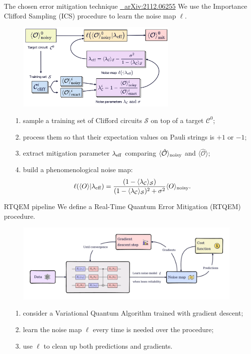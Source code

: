 \documentclass[8pt, xcolor={svgnames}, hyperref={linkcolor=black}]{beamer}
\begin{document}
\begin{frame}{The chosen error mitigation technique \hfill \href{https://arxiv.org/abs/2112.06255}{\faBook\,\, arXiv:2112.06255}}
\pause
We use the Importance Clifford Sampling (ICS) procedure to learn the noise map $\ell$.
\pause
\begin{figure}
    \includegraphics[width=0.7\textwidth]{figures/ics.png}
\end{figure}
\pause
\begin{itemize}[noitemsep]
\item[1.] sample a training set of Clifford circuits $\mathcal{S}$ on top of a target $\mathcal{C}^0$;
\pause
\item[2.] process them so that their expectation values on Pauli strings is  $+1$ or $-1$;
\pause
\item[3.] extract mitigation parameter $\lambda_{\rm eff}$ comparing $\langle \hat{\mathcal{O}}\rangle_{\rm noisy}$ and $\langle \hat{\mathcal{O}}\rangle$;
\pause
\item[4.] build a phenomenological noise map:
$$ \ell(\langle O \rangle | \lambda_{\rm eff}) = \frac{(1 - \langle \lambda_{\mathcal{C}}
\rangle_{\mathcal{S}})}{(1 - \langle \lambda_{\mathcal{C}}\rangle_{\mathcal{S}})^2 
+ \sigma^2} \langle O \rangle_{\rm noisy}.$$
\end{itemize}
\end{frame}

\begin{frame}{RTQEM pipeline}
We define a Real-Time Quantum Error Mitigation (RTQEM) procedure.
\pause
\begin{figure}
    \includegraphics[width=1\textwidth]{figures/rtqem.pdf}
\end{figure}
\pause
\begin{itemize}[noitemsep]
\item[1.] consider a Variational Quantum Algorithm trained with gradient descent;
\pause
\item[2.] learn the noise map $\ell$ every time is needed over the procedure;
\pause
\item[3.] use $\ell$ to clean up both predictions and gradients.
\end{itemize}
\end{frame}
\end{document}

